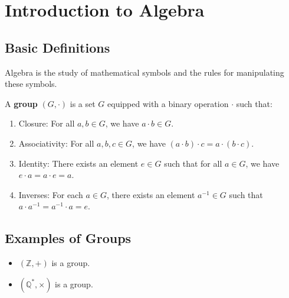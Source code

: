 \chapter{Introduction to Algebra}

\section{Basic Definitions}
Algebra is the study of mathematical symbols and the rules for manipulating these symbols.

\begin{definition}
A \textbf{group} $(G, \cdot)$ is a set $G$ equipped with a binary operation $\cdot$ such that:
\begin{enumerate}
    \item Closure: For all $a, b \in G$, we have $a \cdot b \in G$.
    \item Associativity: For all $a, b, c \in G$, we have $(a \cdot b) \cdot c = a \cdot (b \cdot c)$.
    \item Identity: There exists an element $e \in G$ such that for all $a \in G$, we have $e \cdot a = a \cdot e = a$.
    \item Inverses: For each $a \in G$, there exists an element $a^{-1} \in G$ such that $a \cdot a^{-1} = a^{-1} \cdot a = e$.
\end{enumerate}
\end{definition}

\section{Examples of Groups}
\begin{itemize}
    \item $(\mathbb{Z}, +)$ is a group.
    \item $(\mathbb{Q}^*, \times)$ is a group.
\end{itemize}


